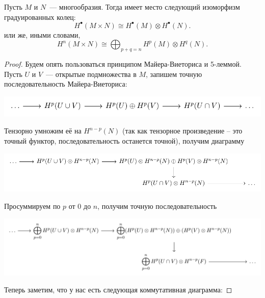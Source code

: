  	 \begin{theorem} 
 	 	Пусть $M$ и $N$~--- многообразия. Тогда имеет место следующий изоморфизм градуированных колец: 
 	 	\[
 	 		H^{\bullet}(M \times N) \cong H^{\bullet}(M) \otimes H^{\bullet}(N).
 	 	\]
 	 	или же, иными словами, 
 	 	\[
 	 		H^{n}(M \times N) \cong \bigoplus_{p + q = n} H^p(M) \otimes H^q(N).
 	 	\]
 	 \end{theorem}
 	 \begin{proof}
 	 	Будем опять пользоваться принципом Майера-Виеториса и 5-леммой. Пусть $U$ и $V$~--- открытые подмножества в $M$, запишем точную последовательность Майера-Виеториса: 
 	 	\begin{center}
 	 		\includegraphics{lectures/7/pictures/cd_21.pdf}
 	 	\end{center}

 	 	Тензорно умножим её на $H^{n - p}(N)$ (так как тензорное произведение -- это точный функтор, последовательность останется точной), получим диаграмму 

 	 	\begin{center}
 	 		\includegraphics{lectures/7/pictures/cd_22.pdf}
 	 	\end{center}

 	 	Просуммируем по $p$ от $0$ до $n$, получим точную последовательность 
 	 	\begin{center}
 	 		\includegraphics{lectures/7/pictures/cd_23.pdf}
 	 	\end{center}

 	 	Теперь заметим, что у нас есть следующая коммутативная диаграмма: 


\end{proof}
